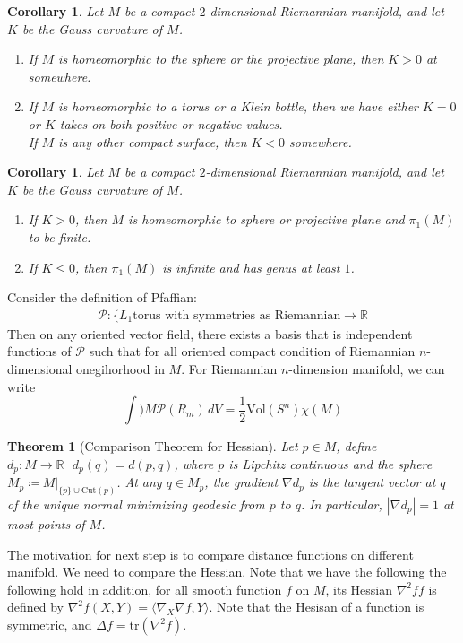 \documentclass[11pt]{book}
\theoremstyle{break}
\theoremstyle{break}
\newtheorem{thm}{Theorem}[section]
\newtheorem{corT}[lem]{Corollary}
\newcommand{\R}{\mathbb{R}}
\begin{document}
\begin{corT}
Let $M$ be a compact $2$-dimensional Riemannian manifold, and let $K$ be the Gauss curvature of $M$. 
\begin{enumerate}
\item If $M$ is homeomorphic to the sphere or the projective plane, then $K>0$ at somewhere. 
\item If $M$ is homeomorphic to a torus or a Klein bottle, then we have either $K = 0$ or $K$ takes on both positive or negative values.  \\
If $M$ is any other compact surface, then $K<0$ somewhere. 
\end{enumerate}
\end{corT}

\begin{corT}
Let $M$ be a compact $2$-dimensional Riemannian manifold, and let $K$ be the Gauss curvature of $M$. 
\begin{enumerate}
\item If $K>0$, then $M$ is homeomorphic to sphere or projective plane and $\pi_1(M)$ to be finite. 
\item If $K\leq 0$, then $\pi_1(M)$ is infinite and has genus at least $1$. 
\end{enumerate}
\end{corT}
 
 
Consider the definition of Pfaffian:
\begin{align*}
\mathcal{P}: \{ L_1 \text{torus with symmetries as Riemannian} \to \R
\end{align*} 
Then on any oriented vector field, there exists a basis that is independent functions of $\mathcal{P}$ such that for all oriented compact condition of Riemannian $n$-dimensional onegihorhood in $M$. For Riemannian $n$-dimension manifold, we can write $$\int)M \mathcal{P}(R_m) \, dV = \frac{1}{2} \text{Vol}(S^n) \chi(M)$$
 
\newpage
\begin{thm}[Comparison Theorem for Hessian]
Let $p \in M$, define $d_p:M \to \R \ \ \ d_p(q) = d(p,q)$, where $p$ is Lipchitz continuous and the sphere $M_p \coloneqq M|_{\{p\} \cup \text{Cut}(p)}$. At any $q \in M_p$, the gradient $\nabla d_p$ is the tangent vector at $q$ of the unique normal minimizing geodesic from $p$ to $q$. In particular, $|\nabla d_p | = 1$ at most points of $M$. 
\end{thm}

The motivation for next step is to compare distance functions on different manifold. We need to compare the Hessian. Note that we have the following the following hold in addition, for all smooth function $f$ on $M$, its Hessian $\nabla^2 f f$ is defined by $\nabla^2 f(X,Y) = \langle \nabla_X \nabla f, Y \rangle$. Note that the Hesisan of a function is symmetric, and $\Delta f = \text{tr}(\nabla^2 f) $. 
\end{document}
